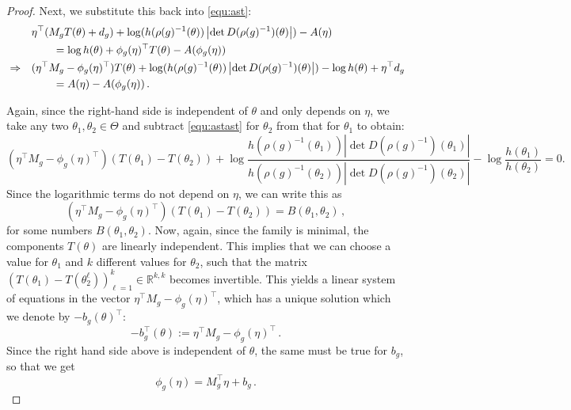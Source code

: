 \documentclass{article}
\begin{document}
\begin{proof}
    Next, we substitute this back into  \eqref{equ:ast}:
    \begin{align}
        &&&\eta^\top (M_{g} T(\theta) + d_{g}) + \log (h(\rho(g)^{-1}(\theta)) \left|\det D(\rho(g)^{-1})(\theta)\right|) - A(\eta) \notag \\
        &&& \qquad = \log h(\theta) + \phi_{g}(\eta)^\top T(\theta) - A(\phi_{g}(\eta)) \\
        &\Rightarrow&& (\eta^\top M_{g} - \phi_{g}(\eta)^\top) T(\theta) + \log (h(\rho(g)^{-1}(\theta)) \left|\det D(\rho(g)^{-1})(\theta)\right|) - \log h(\theta) + \eta^\top d_{g}  \notag \\
        &&& \qquad = A(\eta) - A(\phi_{g}(\eta))\,. \label{equ:astast}
    \end{align}

    Again, since the right-hand side is independent of $\theta$ and only depends on $\eta$, we take any two $\theta_{1}, \theta_{2} \in \Theta$ and subtract  \eqref{equ:astast} for $\theta_{2}$ from that for $\theta_{1}$ to obtain:
    \begin{equation}
        (\eta^\top M_{g} - \phi_{g}(\eta)^\top) (T(\theta_{1}) - T(\theta_{2})) + \log \frac{h(\rho(g)^{-1}(\theta_{1})) \left|\det D(\rho(g)^{-1})(\theta_{1})\right|}{h(\rho(g)^{-1}(\theta_{2})) \left|\det D(\rho(g)^{-1})(\theta_{2})\right|} - \log \frac{h(\theta_{1})}{h(\theta_{2})} = 0.
    \end{equation}
    Since the logarithmic terms do not depend on $\eta$, we can write this as
    \begin{equation}
        (\eta^\top M_{g} - \phi_{g}(\eta)^\top) (T(\theta_{1}) - T(\theta_{2})) = B(\theta_{1}, \theta_{2})\,,
    \end{equation}
    for some numbers $B(\theta_1,\theta_2)$. Now, again, since the family is minimal, the components $T(\theta)$ are linearly independent. This implies that we can choose a value for $\theta_1$ and $k$ different values for $\theta_2$, such that the matrix $(T(\theta_{1}) - T(\theta_{2}^\ell))_{\ell=1}^k\in \mathbb{R}^{k,k}$ becomes invertible. This yields a linear system of equations in the vector $\eta^\top M_{g} - \phi_{g}(\eta)^\top$, which has a unique solution which we denote by $-b_g(\theta)^{\top}$:
    \begin{equation}
        -b_{g}^\top(\theta) := \eta^\top M_{g} - \phi_{g}(\eta)^\top\,. \label{equ:triangle}
    \end{equation}
    Since the right hand side above is independent of $\theta$, the same must be true for $b_g$, so that we get
    \begin{equation}
        \phi_{g}(\eta) = M_{g}^\top \eta + b_{g}\,.
    \end{equation}


\end{proof}
\end{document}
